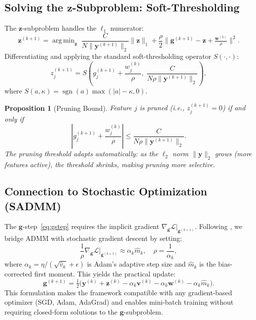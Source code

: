 \documentclass{uai2026} %
\newtheorem{proposition}[theorem]{Proposition}
\theoremstyle{definition}
\theoremstyle{remark}
\newcommand{\bz}{\mathbf{z}}
\newcommand{\bg}{\mathbf{g}}
\newcommand{\bv}{\mathbf{v}}
\newcommand{\bw}{\mathbf{w}}
\newcommand{\by}{\mathbf{y}}
\DeclareMathOperator{\sgn}{sgn}
\DeclareMathOperator*{\argmin}{arg\,min}
\begin{document}
\subsection{Solving the $\bz$-Subproblem: Soft-Thresholding}\label{sec:zstep}

The $\bz$-subproblem handles the $\ell_1$ numerator:
\begin{equation}\label{eq:zsub}
    \bz^{(k+1)} = \argmin_{\bz}\;\frac{C}{N\lVert\by^{(k+1)}\rVert_2}\lVert\bz\rVert_1
    + \frac{\rho}{2}\Big\lVert\bg^{(k+1)} - \bz + \tfrac{\bw^{(k)}}{\rho}\Big\rVert^2.
\end{equation}
Differentiating and applying the standard soft-thresholding operator $S(\cdot,\cdot)$:
\begin{equation}\label{eq:zupdate}
    z_j^{(k+1)} = S\!\left(g_j^{(k+1)} + \frac{w_j^{(k)}}{\rho},\;\frac{C}{N\rho\lVert\by^{(k+1)}\rVert_2}\right),
\end{equation}
where $S(a,\kappa) = \sgn(a)\max(|a|-\kappa, 0)$.

\begin{proposition}[Pruning Bound]\label{prop:pruning}
Feature $j$ is pruned (i.e., $z_j^{(k+1)} = 0$) if and only if
\begin{equation}\label{eq:prune-bound}
    \left|g_j^{(k+1)} + \frac{w_j^{(k)}}{\rho}\right| \leq \frac{C}{N\rho\lVert\by^{(k+1)}\rVert_2}.
\end{equation}
The pruning threshold adapts automatically: as the $\ell_2$ norm $\lVert\by\rVert_2$ grows (more features active), the threshold shrinks, making pruning more selective.
\end{proposition}

\subsection{Connection to Stochastic Optimization (SADMM)}\label{sec:sadmm}

The $\bg$-step~\eqref{eq:gstep} requires the implicit gradient $\nabla_{\bg}\mathcal{L}|_{\bg^{(k+1)}}$.
Following \citet{yu2026sadmm}, we bridge ADMM with stochastic gradient descent by setting:
\begin{equation}\label{eq:sadmm-bridge}
    \frac{1}{\rho}\nabla_{\bg}\mathcal{L}\big|_{\bg^{(k+1)}} \approx \alpha_k \hat{m}_k,
    \quad \rho = \frac{1}{\alpha_k},
\end{equation}
where $\alpha_k = \eta / (\sqrt{\hat{v}_k} + \epsilon)$ is Adam's adaptive step size and $\hat{m}_k$ is the bias-corrected first moment.
This yields the practical update:
\begin{equation}\label{eq:g-practical}
    \bg^{(k+1)} = \tfrac{1}{2}\bigl(\by^{(k)} + \bz^{(k)}
    - \alpha_k\bv^{(k)} - \alpha_k\bw^{(k)} - \alpha_k\hat{m}_k\bigr).
\end{equation}
This formulation makes the framework compatible with any gradient-based optimizer (SGD, Adam, AdaGrad) and enables mini-batch training without requiring closed-form solutions to the $\bg$-subproblem.
\end{document}
